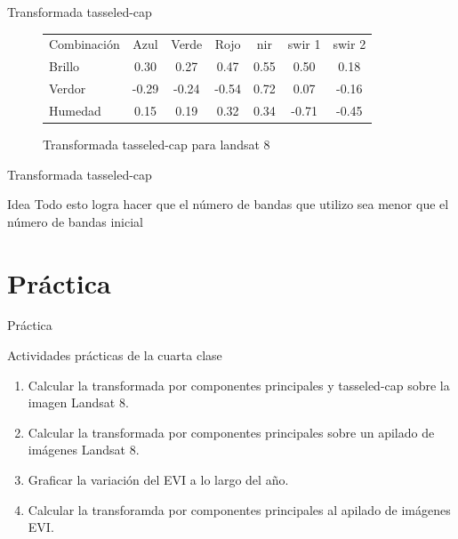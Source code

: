 \documentclass[]{beamer}
\begin{document}
\begin{frame}{Transformada tasseled-cap}
    \begin{figure}
      \begin{tabular}{l c c c c c c }
        Combinación  & Azul & Verde & Rojo & nir & swir 1 & swir 2\\
        Brillo &  0.30  & 0.27  & 0.47  & 0.55  & 0.50  & 0.18\\
        Verdor & -0.29  &-0.24  &-0.54  & 0.72 & 0.07  &-0.16\\
        Humedad&  0.15  & 0.19  & 0.32  & 0.34  &-0.71  &-0.45
      \end{tabular}
      \caption{Transformada tasseled-cap para landsat 8 }
    \end{figure}
\end{frame}

\begin{frame}{Transformada tasseled-cap}
  \begin{block}{Idea}
    Todo esto logra hacer que el número de bandas que utilizo sea menor que el
      número de bandas inicial
  \end{block}
\end{frame}

\section{Práctica}

\begin{frame}{Práctica}
  \begin{exampleblock}{Actividades prácticas de la cuarta clase}
    \begin{enumerate}
      \item Calcular la transformada por componentes principales y tasseled-cap sobre la imagen Landsat 8.
      \item Calcular la transformada por componentes principales sobre un apilado de imágenes Landsat 8.
      \item Graficar la variación del EVI a lo largo del año.
      \item Calcular la transforamda por componentes principales al apilado de imágenes EVI.
    \end{enumerate}
  \end{exampleblock}
\end{frame}
\end{document}
